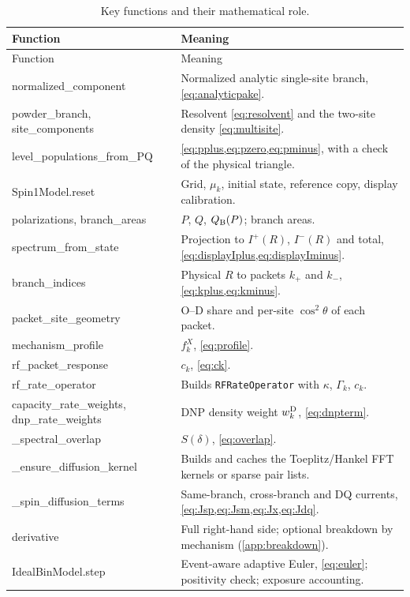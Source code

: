 \documentclass[11pt]{article}
\newcommand{\Iplus}{I^{+}}
\newcommand{\Iminus}{I^{-}}
\newcommand{\code}[1]{\texttt{#1}}
\begin{document}
\begin{longtable}{>{\ttfamily}L{0.36\textwidth} L{0.58\textwidth}}
\caption{Key functions and their mathematical role.}\label{tab:functionmap}\\
\toprule
Function & Meaning\\
\midrule
\endfirsthead
\toprule
Function & Meaning\\
\midrule
\endhead
normalized\_component & Normalized analytic single-site branch, \cref{eq:analyticpake}.\\
powder\_branch, site\_components & Resolvent \cref{eq:resolvent} and the two-site density \cref{eq:multisite}.\\
level\_populations\_from\_PQ & \cref{eq:pplus,eq:pzero,eq:pminus}, with a check of the physical triangle.\\
Spin1Model.reset & Grid, \(\mu_k\), initial state, reference copy, display calibration.\\
polarizations, branch\_areas & \(P\), \(Q\), \(Q_{\rm B}(P)\); branch areas.\\
spectrum\_from\_state & Projection to \(\Iplus(R)\), \(\Iminus(R)\) and total, \cref{eq:displayIplus,eq:displayIminus}.\\
branch\_indices & Physical \(R\) to packets \(k_+\) and \(k_-\), \cref{eq:kplus,eq:kminus}.\\
packet\_site\_geometry & O--D share and per-site \(\cos^2\theta\) of each packet.\\
mechanism\_profile & \(f^X_k\), \cref{eq:profile}.\\
rf\_packet\_response & \(c_k\), \cref{eq:ck}.\\
rf\_rate\_operator & Builds \code{RFRateOperator} with \(\kappa\), \(\Gamma_k\), \(c_k\).\\
capacity\_rate\_weights, dnp\_rate\_weights & DNP density weight \(w^{\rm D}_k\), \cref{eq:dnpterm}.\\
\_spectral\_overlap & \(S(\delta)\), \cref{eq:overlap}.\\
\_ensure\_diffusion\_kernel & Builds and caches the Toeplitz/Hankel FFT kernels or sparse pair lists.\\
\_spin\_diffusion\_terms & Same-branch, cross-branch and DQ currents, \cref{eq:Jsp,eq:Jsm,eq:Jx,eq:Jdq}.\\
derivative & Full right-hand side; optional breakdown by mechanism (\cref{app:breakdown}).\\
IdealBinModel.step & Event-aware adaptive Euler, \cref{eq:euler}; positivity check; exposure accounting.\\

\end{longtable}
\end{document}
